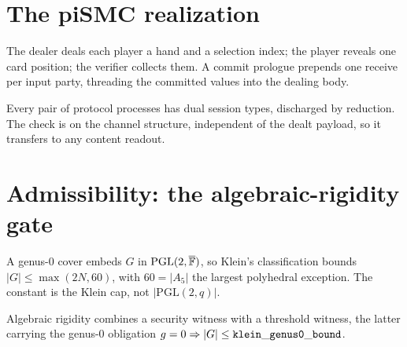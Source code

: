 \chapter{The piSMC realization}

\begin{definition}
  \label{def:exchange_programs}
  \rocqok
  The dealer deals each player a hand and a selection index; the player reveals
  one card position; the verifier collects them. A commit prologue prepends one
  receive per input party, threading the committed values into the dealing body.
\end{definition}

\begin{lemma}
  \label{lem:session_duality}
  \rocqok
  Every pair of protocol processes has dual session types, discharged by
  reduction. The check is on the channel structure, independent of the dealt
  payload, so it transfers to any content readout.
\end{lemma}

\chapter{Admissibility: the algebraic-rigidity gate}

\begin{definition}
  \label{def:klein_bound}
  \rocqok
  A genus-0 cover embeds $G$ in $\mathrm{PGL}(2,\overline{\mathbb{F}})$, so Klein's
  classification bounds $|G| \le \max(2N,60)$, with $60=|A_5|$ the largest
  polyhedral exception. The constant is the Klein cap, not $|\mathrm{PGL}(2,q)|$.
\end{definition}

\begin{definition}
  \label{def:algebraic_rigidity}
  \rocqok
  Algebraic rigidity combines a security witness with a threshold witness, the
  latter carrying the genus-0 obligation $g=0 \Rightarrow |G| \le
  \mathtt{klein\_genus0\_bound}$.
\end{definition}

